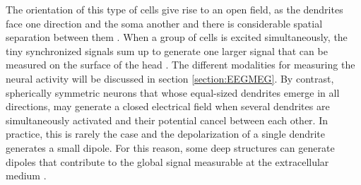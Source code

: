 The orientation of this type of cells give rise to an open field, as the dendrites face one direction and the soma another and there is considerable spatial separation between them \citep{Buzsaki2012}. When a group of cells is excited simultaneously, the tiny synchronized signals sum up to generate one larger signal that can be measured on the surface of the head \citep{Bear2016}. The different modalities for measuring the neural activity will be discussed in section \ref{section:EEGMEG}. By contrast, spherically symmetric neurons that whose equal-sized dendrites emerge in all directions, may generate a closed electrical field when several dendrites are simultaneously activated and their potential cancel between each other. In practice, this is rarely the case and the depolarization of a single dendrite generates a small dipole. For this reason, some deep structures can generate dipoles that contribute to the global signal measurable at the extracellular medium \citep{Attal2007}. 


 
